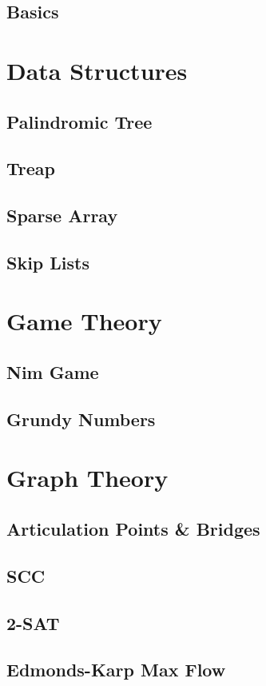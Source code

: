 \documentclass[twocolumn]{article}
\begin{document}
		\subsection{Basics}
		
	\section{Data Structures}
		\subsection{Palindromic Tree}
		\subsection{Treap}
		\subsection{Sparse Array}
		\subsection{Skip Lists}
	\section{Game Theory}
		\subsection{Nim Game}
		\subsection{Grundy Numbers}
	\section{Graph Theory}
		\subsection{Articulation Points \& Bridges}
		\subsection{SCC}
		\subsection{2-SAT}
		\subsection{Edmonds-Karp Max Flow}
\end{document}
